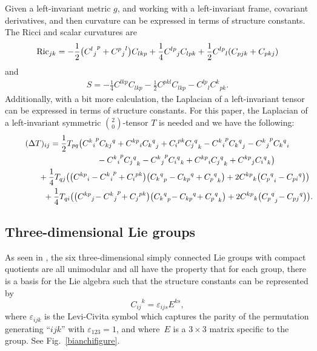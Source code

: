 \documentclass[10pt,a4paper]{amsart}
\numberwithin{equation}{section}
\begin{document}
Given a left-invariant metric $g$, and working with a left-invariant frame, covariant derivatives, and then curvature can be expressed in terms of structure constants. The Ricci and scalar curvatures are
\begin{gather}\label{Riccistructureeqn}
{\rm Ric}_{jk} = -\frac{1}{2} \big({{C^l}_j}^p + {{C^p}_j}^l\big) C_{lkp}
			+ \frac{1}{4} {C^{lp}}_j C_{lpk}
			+ \frac{1}{2} {C^{lp}}_l(C_{pjk} + C_{pkj})
\end{gather}
and
\begin{gather} \label{Scalarstructureeqn}
S = -\frac{1}{4} C^{lkp} C_{lkp} - \frac{1}{2} C^{pkl} C_{lkp} - {C^{lp}}_l {C^k}_{pk}.
\end{gather}
Additionally, with a bit more calculation, the Laplacian of a left-invariant tensor can be expressed in terms of structure constants. For this paper, the Laplacian of a left-invariant symmetric $\binom{2}{0}$-tensor $T$ is needed and we have the following:
\begin{gather}
(\Delta T)_{ij} = \frac{1}{2} T_{pq}
				\big({{C^k}_i}^p {C_{kj}}^q + {C^{kp}}_i {{C_k}^q}_j + {C_i}^{pk} {{C_j}^q}_k
				-
					{{C^k}_i}^p {{C_k}^q}_j - {{C^k}_j}^p {{C_k}^q}_i \nonumber\\
\hphantom{(\Delta T)_{ij} = \frac{1}{2} T_{pq}\big(}{} -
					{{C^k}_i}^p {{C_j}^q}_k - {{C^k}_j}^p {{C_i}^q}_k
				 +
					{C^{kp}}_i {{C_j}^q}_k + {C^{kp}}_j {{C_i}^q}_k \big)\nonumber \\
\hphantom{(\Delta T)_{ij} =}{}+ \frac{1}{4} T_{qj}
				\big(\big({C^{kp}}_i - {{C^k}_i}^p + {C_i}^{pk}\big)
						\big({{C_k}^q}_p - {C_{kp}}^q + {{C_p}^q}_k\big)
 +2
					{C^{kp}}_k\big({{C_p}^q}_i - {C_{pi}}^q\big) \big) \nonumber\\
\hphantom{(\Delta T)_{ij} =}{}+ \frac{1}{4} T_{qi}
				\big(\big({C^{kp}}_j\! - {{C^k}_j}^p \!+ {C_j}^{pk}\big)
						\big({{C_k}^q}_p\! - {C_{kp}}^q\! + {{C_p}^q}_k\big)
 +2
					{C^{kp}}_k\big({{C_p}^q}_j \! - {C_{pj}}^q\big) \big).\!\!\!\!\!\!\label{Laplacianstructureeqn}
\end{gather}


\subsection{Three-dimensional Lie groups}

As seen in \cite{RyanShepley}, the six three-dimensional simply connected Lie groups with compact quotients are all unimodular and all have the property that for each group, there is a basis for the Lie algebra such that the structure constants can be represented by
\[
{C_{ij}}^k = \varepsilon_{ijs} E^{ks},
\]
where $\varepsilon_{ijk}$ is the Levi-Civita symbol which captures the parity of the permutation generating ``$ijk$'' with $\varepsilon_{123} = 1$, and where~$E$ is a $3 \times 3$ matrix specific to the group. See Fig.~\ref{bianchifigure}.
\end{document}
